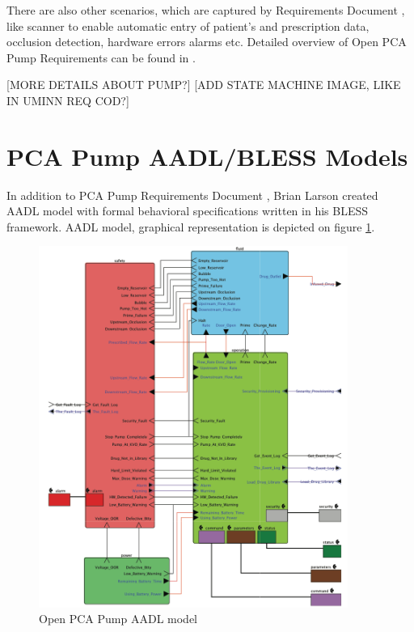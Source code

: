 There are also other scenarios, which are captured by Requirements Document \cite{PcaReq}, like scanner to enable automatic entry of patient's and prescription data, occlusion detection, hardware errors alarms etc. Detailed overview of Open PCA Pump Requirements can be found in \cite{OpenSourcePCAPump:Paper}.

[MORE DETAILS ABOUT PUMP?]
[ADD STATE MACHINE IMAGE, LIKE IN UMINN REQ COD?]



\section{PCA Pump AADL/BLESS Models}
\label{pcapump:aadl-bless-models}

In addition to PCA Pump Requirements Document \cite{PcaReq}, Brian Larson created AADL model with formal behavioral specifications written in his BLESS framework. AADL model, graphical representation is depicted on figure \ref{figure:pca-pump-aadl-model}. 

\begin{figure}%
    \begin{center}
      \includegraphics[width=0.9\textwidth]{figures/pca-pump-aadl-model.png}      
    \end{center}
    \caption{Open PCA Pump AADL model}
    \label{figure:pca-pump-aadl-model}
\end{figure}

